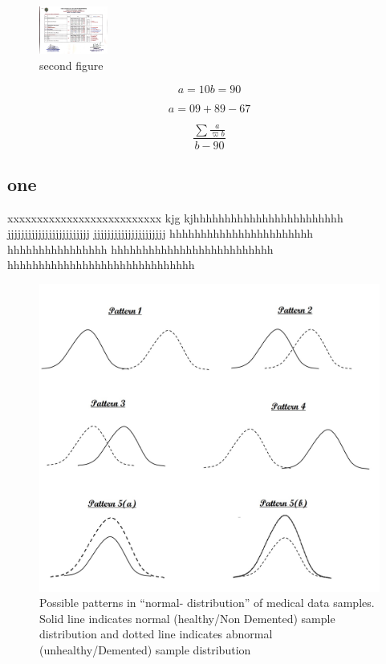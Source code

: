 \documentclass[journal] {article}
\begin{document}
\begin{figure}[t]
	\centering
		\includegraphics[width=0.20\textwidth]{CoE-1st Sem-Page1.jpg}
	\caption{second figure}
	\label{fig:CoE-1st Sem-Page2}
\end{figure}



\begin{equation}
	a=10
	b=90
\end{equation}



	\[
	a=09+89-67
\]


\begin{equation}
\frac{\sum\frac{a}{\varpi b}}{b-90}
\end{equation}



\subsection{one}
xxxxxxxxxxxxxxxxxxxxxxxxxx kjg  kjhhhhhhhhhhhhhhhhhhhhhhhh jjjjjjjjjjjjjjjjjjjjjjjj jjjjjjjjjjjjjjjjjjjjj
hhhhhhhhhhhhhhhhhhhhhhh hhhhhhhhhhhhhhhh hhhhhhhhhhhhhhhhhhhhhhhhhh hhhhhhhhhhhhhhhhhhhhhhhhhhhhhh




\begin{figure}[h]
	\centering
		\includegraphics[width=1.0\textwidth]{Normal_Zones.jpg}
	\caption{Possible patterns in “normal- distribution” of medical data samples. Solid line indicates normal (healthy/Non Demented) sample distribution and dotted line indicates abnormal (unhealthy/Demented) sample distribution }
	\label{fNormal_Zones}
\end{figure}
\end{document}
